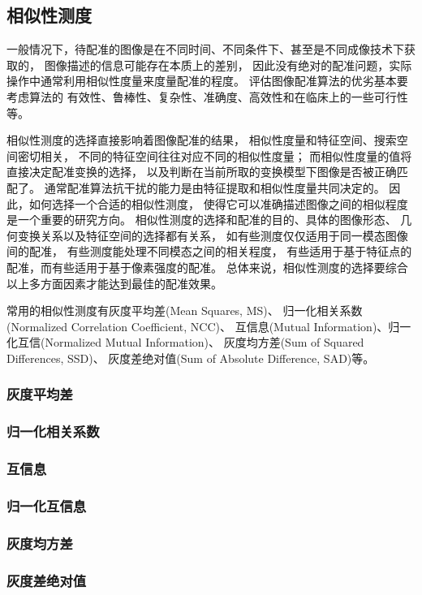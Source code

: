 \subsection{相似性测度}\label{SectionMetric}
一般情况下，待配准的图像是在不同时间、不同条件下、甚至是不同成像技术下获取的，
图像描述的信息可能存在本质上的差别，
因此没有绝对的配准问题，实际操作中通常利用相似性度量来度量配准的程度。
评估图像配准算法的优劣基本要考虑算法的
有效性、鲁棒性、复杂性、准确度、高效性和在临床上的一些可行性等。

相似性测度的选择直接影响着图像配准的结果，
相似性度量和特征空间、搜索空间密切相关，
不同的特征空间往往对应不同的相似性度量；
而相似性度量的值将直接决定配准变换的选择，
以及判断在当前所取的变换模型下图像是否被正确匹配了。
通常配准算法抗干扰的能力是由特征提取和相似性度量共同决定的。
因此，如何选择一个合适的相似性测度，
使得它可以准确描述图像之间的相似程度是一个重要的研究方向。
相似性测度的选择和配准的目的、具体的图像形态、
几何变换关系以及特征空间的选择都有关系，
如有些测度仅仅适用于同一模态图像间的配准，
有些测度能处理不同模态之间的相关程度，
有些适用于基于特征点的配准，而有些适用于基于像素强度的配准。
总体来说，相似性测度的选择要综合以上多方面因素才能达到最佳的配准效果。

常用的相似性测度有灰度平均差(Mean Squares, MS)、
归一化相关系数(Normalized Correlation Coefficient, NCC)、
互信息(Mutual Information)、归一化互信(Normalized Mutual Information)、
灰度均方差(Sum of Squared Differences, SSD)、
灰度差绝对值(Sum of Absolute Difference, SAD)等。


\subsubsection{灰度平均差}

\subsubsection{归一化相关系数}

\subsubsection{互信息}

\subsubsection{归一化互信息}

\subsubsection{灰度均方差}

\subsubsection{灰度差绝对值}

